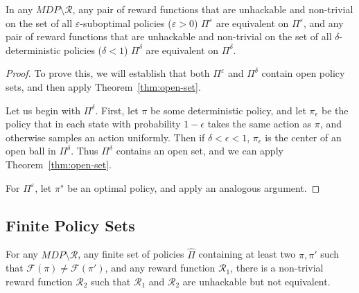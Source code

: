 \begin{corollary}
In any $MDP \setminus \mathcal{R}$, any pair of reward functions that are unhackable and non-trivial on the set of all $\varepsilon$-suboptimal policies ($\varepsilon>0$) $\Pi^\varepsilon$ are equivalent on $\Pi^\varepsilon$, and any pair of reward functions that are unhackable and non-trivial on the set of all $\delta$-deterministic policies ($\delta<1$) $\Pi^\delta$ are equivalent on $\Pi^\delta$.
\end{corollary}
\begin{proof}
To prove this, we will establish that both $\Pi^\varepsilon$ and $\Pi^\delta$ contain open policy sets, and then apply Theorem~\ref{thm:open-set}.

Let us begin with $\Pi^\delta$. First, let $\pi$ be some deterministic policy, and let $\pi_\epsilon$ be the policy that in each state with probability $1-\epsilon$ takes the same action as $\pi$, and otherwise samples an action uniformly. Then if $\delta < \epsilon < 1$, $\pi_\epsilon$ is the center of an open ball in $\Pi^\delta$. Thus $\Pi^\delta$ contains an open set, and we can apply Theorem~\ref{thm:open-set}.

For $\Pi^\varepsilon$, let $\pi^\star$ be an optimal policy, and apply an analogous argument.
\end{proof}





\subsection{Finite Policy Sets}

\begin{theorem}%
For any $MDP \setminus \mathcal{R}$, any finite set of policies $\hat{\Pi}$ containing at least two $\pi,\pi'$ such that $\mathcal{F}(\pi) \neq \mathcal{F}(\pi')$, and any reward function $\mathcal{R}_1$, there is a non-trivial reward function $\mathcal{R}_2$ such that $\mathcal{R}_1$ and $\mathcal{R}_2$ are unhackable but not equivalent.
\end{theorem}

